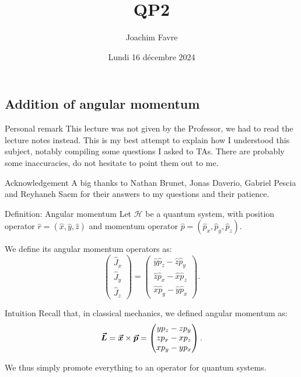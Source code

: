\documentclass[a4paper]{article}
\title{QP2}
\author{Joachim Favre}
\date{Lundi 16 décembre 2024}
\begin{document}
\maketitle


\subsection{Addition of angular momentum}

\begin{parag}{Personal remark}
    This lecture was not given by the Professor, we had to read the lecture notes instead. This is my best attempt to explain how I understood this subject, notably compiling some questions I asked to TAs. There are probably some inaccuracies, do not hesitate to point them out to me.

    \begin{subparag}{Acknowledgement}
        A big thanks to Nathan Brunet, Jonas Daverio, Gabriel Pescia and Reyhaneh Saem for their answers to my questions and their patience.
    \end{subparag}
\end{parag}

\begin{parag}{Definition: Angular momentum}
    Let $\mathcal{H}$ be a quantum system, with position operator $\hat{r} = \left(\hat{x}, \hat{y}, \hat{z}\right)$ and momentum operator $\hat{p} = \left(\hat{p}_x, \hat{p}_y, \hat{p}_z\right)$.

    We define its angular momentum operators as:
    \[\begin{pmatrix} \hat{J}_x \\ \hat{J}_y \\ \hat{J}_z \end{pmatrix} = \begin{pmatrix} \hat{y} \hat{p}_z - \hat{z} \hat{p}_y \\ \hat{z} \hat{p}_x - \hat{x} \hat{p}_z \\ \hat{x} \hat{p}_y - \hat{y} \hat{p}_x \end{pmatrix}.\]

    \begin{subparag}{Intuition}
        Recall that, in classical mechanics, we defined angular momentum as:
        \[\bm{\protect\vec{L}} = \bm{\protect\vec{x}} \times \bm{\protect\vec{p}} = \begin{pmatrix} y p_z - z p_y \\ z p_x - x p_z \\ x p_y - y p_x\end{pmatrix}.\]

        We thus simply promote everything to an operator for quantum systems.
    \end{subparag}
\end{parag}
\end{document}
